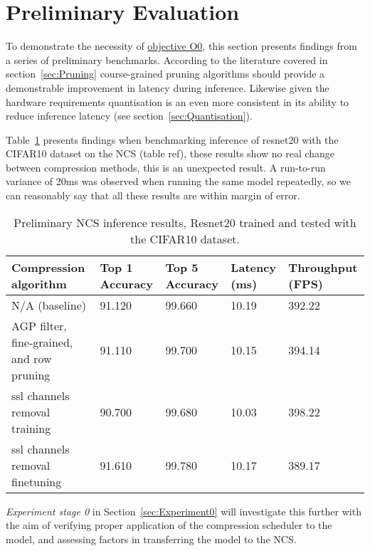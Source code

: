 \documentclass[11pt]{article}
\begin{document}
\newpage
\section{Preliminary Evaluation}\label{sec:prelimEval}
To demonstrate the necessity of \hyperref[obj:VerifyComp]{objective O0}, this section presents findings from a series of preliminary benchmarks. 
According to the literature covered in section~\ref{sec:Pruning} course-grained pruning algorithms should provide a demonstrable improvement in latency during inference.
Likewise given the hardware requirements quantisation is an even more consistent in its ability to reduce inference latency (see section~\ref{sec:Quantisation}).

Table~\ref{tab:PrelimResults} presents findings when benchmarking inference of resnet20 with the CIFAR10 dataset on the NCS (table ref), these results show no real change between compression methods, this is an unexpected result.
A run-to-run variance of 20ms was observed when running the same model repeatedly, so we can reasonably say that all these results are within margin of error.

\begin{table}[H]
    \begin{tabular}{@{}|p{5cm}|p{2cm}|p{2cm}|p{2cm}|p{2cm}|@{}}
    \toprule
    Compression algorithm                     & Top 1 Accuracy & Top 5 Accuracy & Latency (ms) & Throughput (FPS) \\ \midrule
    N/A (baseline)                            & 91.120         & 99.660         & 10.19        & 392.22           \\ \midrule
    AGP filter, fine-grained, and row pruning & 91.110         & 99.700         & 10.15        & 394.14           \\ \midrule
    ssl channels removal training             & 90.700         & 99.680         & 10.03        & 398.22           \\ \midrule
    ssl channels removal finetuning           & 91.610         & 99.780         & 10.17        & 389.17           \\
    \bottomrule
    \end{tabular}
    \caption{Preliminary NCS inference results, Resnet20 trained and tested with the CIFAR10 dataset.}
    \label{tab:PrelimResults}
\end{table}

\emph{Experiment stage 0} in Section~\ref{sec:Experiment0} will investigate this further with the aim of verifying proper application of the compression scheduler to the model, and assessing factors in transferring the model to the NCS.
\end{document}
